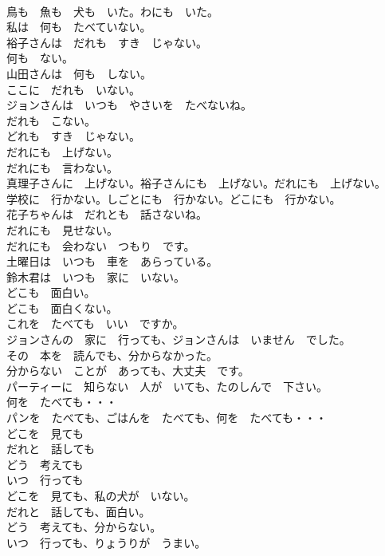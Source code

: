 \documentclass[8pt]{extreport}
\begin{document}
\begin{CJK}{UTF8}{min}
\\	鳥も　魚も　犬も　いた。わにも　いた。	
\\	私は　何も　たべていない。	
\\	裕子さんは　だれも　すき　じゃない。	
\\	何も　ない。	
\\	山田さんは　何も　しない。	
\\	ここに　だれも　いない。	
\\	ジョンさんは　いつも　やさいを　たべないね。	
\\	だれも　こない。	
\\	どれも　すき　じゃない。	
\\	だれにも　上げない。	
\\	だれにも　言わない。	
\\	真理子さんに　上げない。裕子さんにも　上げない。だれにも　上げない。	
\\	学校に　行かない。しごとにも　行かない。どこにも　行かない。	
\\	花子ちゃんは　だれとも　話さないね。	
\\	だれにも　見せない。	
\\	だれにも　会わない　つもり　です。	
\\	土曜日は　いつも　車を　あらっている。	
\\	鈴木君は　いつも　家に　いない。	
\\	どこも　面白い。	
\\	どこも　面白くない。	
\\	これを　たべても　いい　ですか。	
\\	ジョンさんの　家に　行っても、ジョンさんは　いません　でした。	
\\	その　本を　読んでも、分からなかった。	
\\	分からない　ことが　あっても、大丈夫　です。	
\\	パーティーに　知らない　人が　いても、たのしんで　下さい。	
\\	何を　たべても・・・	
\\	パンを　たべても、ごはんを　たべても、何を　たべても・・・	
\\	どこを　見ても	
\\	だれと　話しても	
\\	どう　考えても	
\\	いつ　行っても	
\\	どこを　見ても、私の犬が　いない。	
\\	だれと　話しても、面白い。	
\\	どう　考えても、分からない。	
\\	いつ　行っても、りょうりが　うまい。	

\end{CJK}
\end{document}
